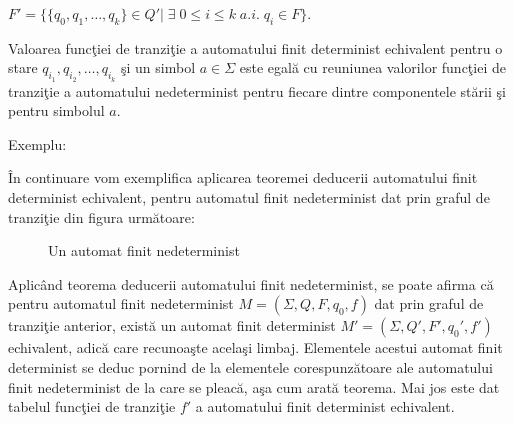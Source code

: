 $ F' = \{ \{ q_{0}, q_{1}, \dots, q_{k} \} \in Q' | \; \exists \; 0 \leq i \leq k \; a.i. \; q_i \in F \} $.

Valoarea funcţiei de tranziţie a automatului finit determinist echivalent pentru o stare $ q_{i_{1}}, q_{i_{2}}, \dots, q_{i_{k}} $ şi un simbol $ a \in \Sigma $ este egală cu reuniunea valorilor funcţiei de tranziţie a automatului nedeterminist pentru fiecare dintre componentele stării şi pentru simbolul $ a $.

Exemplu:

În continuare vom exemplifica aplicarea teoremei deducerii automatului finit determinist echivalent, pentru automatul finit nedeterminist dat prin graful de tranziţie din figura următoare:

\begin{figure}[H]
\centering
{}
\caption{Un automat finit nedeterminist}
\end{figure}

Aplicând teorema deducerii automatului finit nedeterminist, se poate afirma că pentru automatul finit nedeterminist $M=(\Sigma, Q, F, q_{0}, f)$ dat prin graful de tranziţie anterior, există un automat finit determinist $M'=(\Sigma, Q', F', q_{0}', f')$ echivalent, adică care recunoaşte acelaşi limbaj. Elementele acestui automat finit determinist se deduc pornind de la elementele corespunzătoare ale automatului finit nedeterminist de la care se pleacă, aşa cum arată teorema. Mai jos este dat tabelul funcţiei de tranziţie $ f' $ a automatului finit determinist echivalent.

